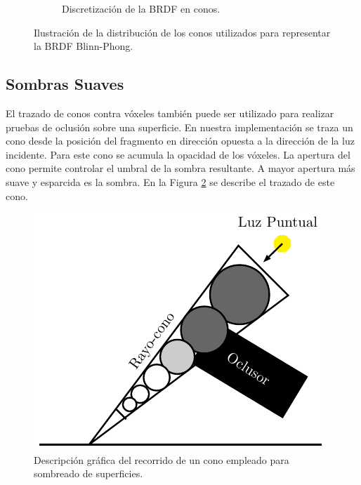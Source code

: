 \begin{figure}[H]
\begin{subfigure}[t]{.32\linewidth}
		\caption*{Discretización de la BRDF en conos.}
	\end{subfigure}%
	\caption{Ilustración de la distribución de los conos utilizados para representar la \ac{BRDF} Blinn-Phong.}
	\label{fig:brdf_cones2}
\end{figure}

\subsection{Sombras Suaves} %
\label{sub:sombras_suaves_con_trazado_de_conos}
El trazado de conos contra vóxeles también puede ser utilizado para realizar pruebas de oclusión sobre una superficie. En nuestra implementación se traza un cono desde la posición del fragmento en dirección opuesta a la dirección de la luz incidente. Para este cono se acumula la opacidad de los vóxeles. La apertura del cono permite controlar el umbral de la sombra resultante. A mayor apertura más suave y esparcida es la sombra. En la Figura \ref{fig:shadow_cone_prop} se describe el trazado de este cono.

\begin{figure}[H]
	\centering
	\captionsetup{justification=centering}
	\includegraphics[width=.4\linewidth]{media/shadow_cone.pdf}
	\caption{Descripción gráfica del recorrido de un cono empleado para sombreado de superficies.}
	\label{fig:shadow_cone_prop}
\end{figure}

